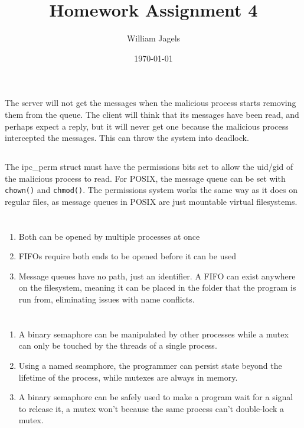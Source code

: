 \documentclass[a4paper,11pt]{article}
\title{Homework Assignment 4}
\author{William Jagels}
\date{\today}
\def\code#1{\texttt{#1}}
\begin{document}
\maketitle

\section{}
\subsection{}
The server will not get the messages when the malicious process starts removing them
from the queue.
The client will think that its messages have been read, and perhaps expect a reply, but
it will never get one because the malicious process intercepted the messages.
This can throw the system into deadlock.
\subsection{}
The ipc\_perm struct must have the permissions bits set to allow the uid/gid of the
malicious process to read.
For POSIX, the message queue can be set with \code{chown()} and \code{chmod()}.
The permissions system works the same way as it does on regular files, as message queues
in POSIX are just mountable virtual filesystems.

\section{}
\begin{enumerate}
  \item Both can be opened by multiple processes at once
  \item FIFOs require both ends to be opened before it can be used
  \item Message queues have no path, just an identifier.
    A FIFO can exist anywhere on the filesystem, meaning it can be placed in the folder
    that the program is run from, eliminating issues with name conflicts.
\end{enumerate}

\section{}
\begin{enumerate}
  \item A binary semaphore can be manipulated by other processes while a mutex can
    only be touched by the threads of a single process.
  \item Using a named seamphore, the programmer can persist state beyond the lifetime
    of the process, while mutexes are always in memory.
  \item A binary semaphore can be safely used to make a program wait for a signal to
    release it, a mutex won't because the same process can't double-lock a mutex.
\end{enumerate}
\end{document}
